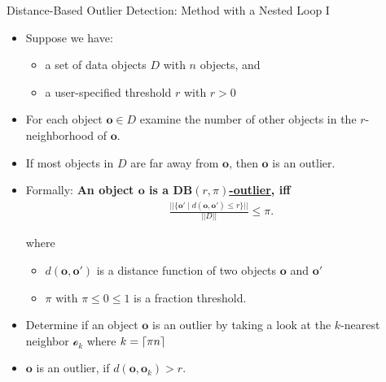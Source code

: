 \begin{frame}{Distance-Based Outlier Detection: Method with a Nested Loop I}
	\begin{itemize}
		\item Suppose we have:
		      \begin{itemize}
			      \item a set of data objects $D$ with $n$ objects, and
			      \item a user-specified threshold $r$ with $r > 0$
		      \end{itemize}
		\item For each object $\mathbf{o}\in D$ examine the number of other objects in the $r$-neighborhood of $\mathbf{o}$.
		\item If most objects in $D$ are far away from $\mathbf{o}$, then $\mathbf{o}$ is an outlier.
		\item Formally: \textbf{An object $\mathbf{o}$ is a \underline{$\mathbf{DB}(r, \pi)$-outlier}, iff}
		      \begin{align}\label{db-outlier}
			      \frac{||\{\mathbf{o'} \; \vert \; d(\mathbf{o},\mathbf{o'}) \leq r \}|| }{||D||} \leq \pi.
		      \end{align}

		      where
		      \begin{itemize}
			      \item $d(\mathbf{o},\mathbf{o}')$ is a distance function of two objects $\mathbf{o}$ and $\mathbf{o}'$
			      \item $\pi$ with $\pi\leq0\leq1$ is a fraction threshold.
		      \end{itemize}
		\item Determine if an object $\mathbf{o}$ is an outlier by taking a look at the $k$-nearest neighbor $\mathcal{o}_k$ where $k=\ceil*{\pi n}$
		\item $\mathbf{o}$ is an outlier, if $d(\mathbf{o}, \mathbf{o}_k) > r$.
	\end{itemize}
\end{frame}


